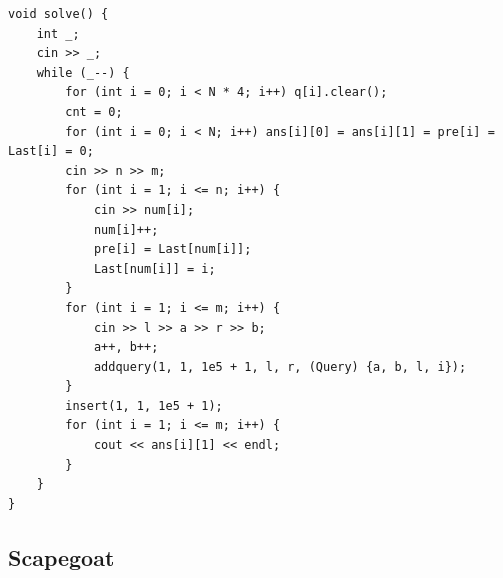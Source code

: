 \documentclass[twoside]{article}
\begin{document}
\begin{lstlisting}
void solve() {
    int _;
    cin >> _;
    while (_--) {
        for (int i = 0; i < N * 4; i++) q[i].clear();
        cnt = 0;
        for (int i = 0; i < N; i++) ans[i][0] = ans[i][1] = pre[i] = Last[i] = 0;
        cin >> n >> m;
        for (int i = 1; i <= n; i++) {
            cin >> num[i];
            num[i]++;
            pre[i] = Last[num[i]];
            Last[num[i]] = i;
        }
        for (int i = 1; i <= m; i++) {
            cin >> l >> a >> r >> b;
            a++, b++;
            addquery(1, 1, 1e5 + 1, l, r, (Query) {a, b, l, i});
        }
        insert(1, 1, 1e5 + 1);
        for (int i = 1; i <= m; i++) {
            cout << ans[i][1] << endl;
        }
    }
}
\end{lstlisting}
\subsection{Scapegoat}
\end{document}
